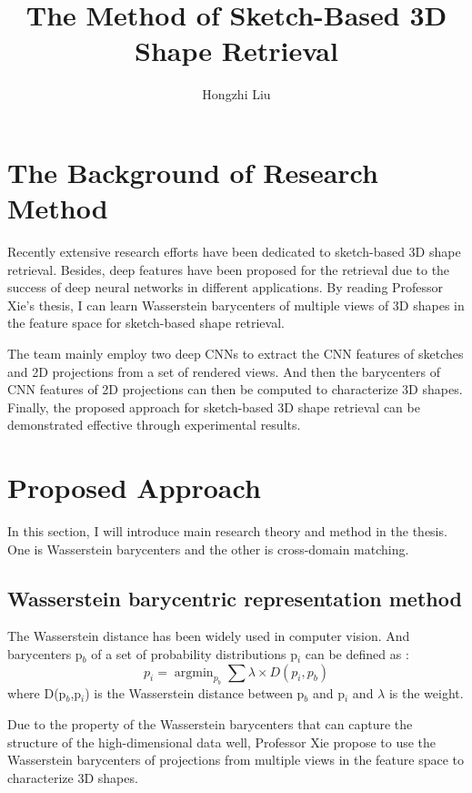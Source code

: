 \documentclass{article}
\author{Hongzhi Liu}
\title{The Method of Sketch-Based 3D Shape Retrieval}
\begin{document}
\maketitle
  \par
  \section{The Background of Research Method }
  Recently extensive research efforts have been dedicated to sketch-based 3D shape retrieval. Besides, deep features have been proposed for the retrieval due to the success of deep neural networks in different applications. By reading Professor Xie's thesis, I can learn Wasserstein barycenters of multiple views of 3D shapes in the feature space for sketch-based shape retrieval.

  The team mainly employ two deep CNNs to extract the CNN features of sketches and 2D projections from a set of rendered views. And then the barycenters of CNN features of 2D projections can then be computed to characterize 3D shapes. Finally, the proposed approach for sketch-based 3D shape retrieval can be demonstrated effective through experimental results.

\section{Proposed Approach}

  In this section, I will introduce main research theory and method in the thesis. One is Wasserstein barycenters and the other is cross-domain matching.

\subsection{Wasserstein barycentric representation method}

  The Wasserstein distance has been widely used in computer vision. And barycenters p$_{b}$ of a set of probability distributions p$_{i}$ can be defined as \cite{Cuturi2015A}:
\begin{equation}
   p_{i} = \mathop{\arg\min}_{p_{b}}{\sum{\lambda\times D(p_{i},p_{b})}}
 \end{equation}
  where D(p$_{b}$,p$_{i}$) is the Wasserstein distance between p$_{b}$ and p$_{i}$ and $\lambda$ is the weight.
  
  Due to the property of the Wasserstein barycenters that can capture the structure of the high-dimensional data well, Professor Xie propose to use the Wasserstein barycenters of projections from multiple views in the feature space to characterize 3D shapes.
\end{document}
